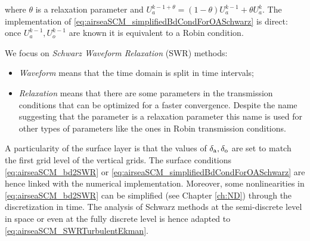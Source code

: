 where $\theta$ is a relaxation parameter and
$U_a^{k-1+\theta} = (1-\theta) U_a^{k-1} + \theta U_a^{k}$.
The implementation of
\eqref{eq:airseaSCM_simplifiedBdCondForOASchwarz} is direct:
once $U_a^{k-1}, U_o^{k-1}$ are known it is equivalent to a Robin
condition.
\par
We focus on \textit{Schwarz Waveform Relaxation} (SWR) methods:
\begin{itemize}
	\item \textit{Waveform} means that the time domain
		is split in time intervals;
	\item \textit{Relaxation} means that there
		are some parameters in the transmission conditions
		that can be optimized for a faster convergence.
		Despite the name suggesting that the parameter is a
		relaxation parameter this name is used for
		other types of parameters like the ones in
		Robin transmission conditions.
\end{itemize}
\par
A particularity of the surface layer is that the values of
$\delta_{\rm a}, \delta_{\rm o}$ are set to match the first
grid level of the vertical grids. The surface conditions
\eqref{eq:airseaSCM_bd2SWR} or
\eqref{eq:airseaSCM_simplifiedBdCondForOASchwarz} are hence
linked with the numerical implementation.
Moreover, some nonlinearities in
\eqref{eq:airseaSCM_bd2SWR} can be simplified
(see Chapter \ref{ch:ND}) through the discretization in time.
The analysis of Schwarz methods at the semi-discrete level in space
or even at the fully discrete level
is hence adapted to \eqref{eq:airseaSCM_SWRTurbulentEkman}.
